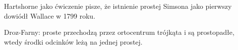 Hartshorne jako ćwiczenie \cite[s. 61]{hartshorne2000} pisze, że istnienie prostej Simsona jako pierwszy dowiódł Wallace w 1799 roku.

Droz-Farny: proste przechodzą przez ortocentrum trójkąta i są prostopadłe, wtedy środki odcinków leżą na jednej prostej. %

%




